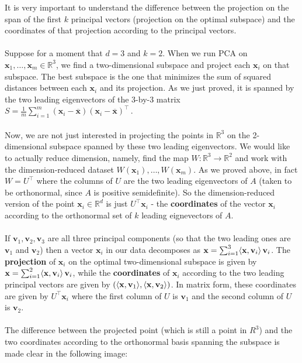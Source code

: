 \documentclass[11pt]{article}
\newcommand{\R}{\ensuremath{\mathbb{R}}}
\newcommand{\Tr}{\ensuremath{\top}}
\newcommand{\V}[1]{\mathbf{#1}}
\begin{document}
It is very important to understand the difference between 
the projection on the span of the first $k$ principal vectors (projection on the
optimal subspace) and the coordinates of that projection according to the
principal vectors.
\\~\\
Suppose for a moment that $d=3$ and $k=2$. When we run PCA on
$\V{x}_1,\ldots,\V{x}_m\in\R^3$, we find a two-dimensional subspace and project
each $\V{x}_i$ on that subspace. The best subspace is the one that minimizes the
sum of squared distances between each $\V{x}_i$ and its projection. As we just
proved, it is spanned by the two leading eigenvectors of the $3$-by-$3$ matrix
$
           S = \frac{1}{m}\sum_{i=1}^m (\V{x}_i-\overline{\V{x}}) 
           (\V{x}_i -\overline{\V{x}})^\Tr\,.
         $
\\~\\
Now, we are not just interested in projecting the points in $\R^3$ 
on the 2-dimensional subspace  spanned by these two leading eigenvectors.
We would like to actually reduce dimension, namely, find the map 
$W:\R^3\to \R^2$ and work with the dimension-reduced dataset  
$W(\V{x}_1),\ldots,W(\V{x}_m)$. As we proved above, 
in fact $W=U^\top$ where the columns of
$U$ are the two leading eigenvectors of $A$ (taken to be orthonormal, since $A$
is positive semidefinite). So the dimension-reduced version of the point
$\V{x}_i\in\R^d$ is just
$U^\top \V{x}_i$ - the {\bf coordinates} of the vector $\V{x}_i$ according to the
orthonormal set of $k$ leading eignevectors of $A$. 
\\~\\
If $\V{v}_1,\V{v}_2,\V{v}_3$  are all three principal components (so that the
two leading ones are $\V{v}_1$ and $\V{v}_2$) then 
a vector $\V{x}_i$ in our data decomposes as
$\V{x}=\sum_{i=1}^3 \inner{\V{x},\V{v}_i}\, \V{v}_i$. 
The {\bf projection}
of $\V{x}_i$ on the optimal two-dimensional subspace 
is given by 
$\V{x}=\sum_{i=1}^2 \inner{\V{x},\V{v}_i}\, \V{v}_i$, while the 
{\bf coordinates}
of $\V{x}_i$ according to the two leading principal vectors are
given by $(\inner{\V{x},\V{v}_1},\inner{\V{x},\V{v}_2})$. In matrix form, these
coordinates are given by $U^\top \V{x}_i$ where the first column of $U$ is
$\V{v}_1$ and the second column of $U$ is $\V{v}_2$.
\\~\\
The difference between the projected point (which is still a point in $R^3$) and
the two coordinates according to the orthonormal basis spanning the subspace is
made clear in the following image:
\end{document}
